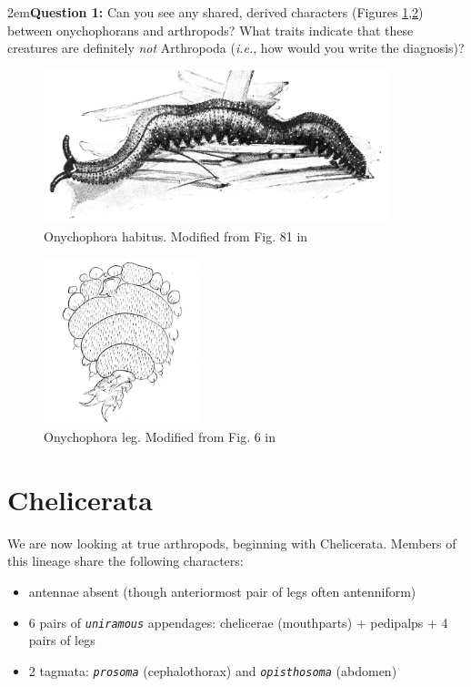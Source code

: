 \documentclass[letterpaper, 11pt]{article}
\newcommand{\latinword}[1]{\texttt{\itshape #1}}%
\begin{document}
\hangindent2em\textbf{Question 1:} Can you see any shared, derived characters (Figures \ref{fig:onych},\ref{fig:onychLeg}) between onychophorans and arthropods? What traits indicate that these creatures are definitely \textit{not} Arthropoda (\textit{i.e.}, how would you write the diagnosis)? \vspace{2cm}

\begin{figure}[ht!]
  \centering
    \includegraphics[width=0.9\textwidth]{onychophora.png}
  \caption{Onychophora habitus. Modified from Fig. 81 in \cite{bhlitem40112britmus}}
  \label{fig:onych}
\end{figure}

\begin{figure}[ht!]
  \centering
    \includegraphics[width=0.4\textwidth]{onychLeg.png}
  \caption{Onychophora leg. Modified from Fig. 6 in \cite{bhlpart201070OnychLeg}}
  \label{fig:onychLeg}
\end{figure}

\section{Chelicerata}
We are now looking at true arthropods, beginning with Chelicerata. Members of this lineage share the following characters: 
\begin{itemize}
\item antennae absent (though anteriormost pair of legs often antenniform)
\item 6 pairs of \latinword{uniramous} appendages: chelicerae (mouthparts) + pedipalps + 4 pairs of legs
\item 2 tagmata: \latinword{prosoma} (cephalothorax) and \latinword{opisthosoma} (abdomen)
\end{itemize}
\end{document}
